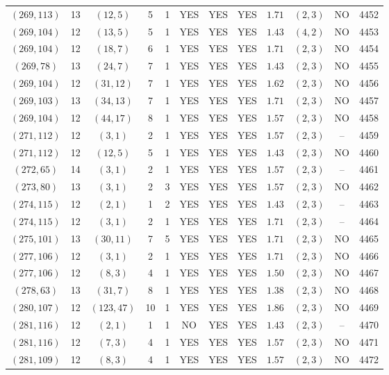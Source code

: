 \begin{longtable}{|c|c|c|c|c|c|c|c|c|c|c|c|}
$(269,113)$ & 13 & $(12,5)$ & 5 & 1 & YES & YES & YES & $1.71$ & $(2,3)$ & NO & 4452\\
$(269,104)$ & 12 & $(13,5)$ & 5 & 1 & YES & YES & YES & $1.43$ & $(4,2)$ & NO & 4453\\
$(269,104)$ & 12 & $(18,7)$ & 6 & 1 & YES & YES & YES & $1.71$ & $(2,3)$ & NO & 4454\\
$(269,78)$ & 13 & $(24,7)$ & 7 & 1 & YES & YES & YES & $1.43$ & $(2,3)$ & NO & 4455\\
$(269,104)$ & 12 & $(31,12)$ & 7 & 1 & YES & YES & YES & $1.62$ & $(2,3)$ & NO & 4456\\
$(269,103)$ & 13 & $(34,13)$ & 7 & 1 & YES & YES & YES & $1.71$ & $(2,3)$ & NO & 4457\\
$(269,104)$ & 12 & $(44,17)$ & 8 & 1 & YES & YES & YES & $1.57$ & $(2,3)$ & NO & 4458\\
$(271,112)$ & 12 & $(3,1)$ & 2 & 1 & YES & YES & YES & $1.57$ & $(2,3)$ & -- & 4459\\
$(271,112)$ & 12 & $(12,5)$ & 5 & 1 & YES & YES & YES & $1.43$ & $(2,3)$ & NO & 4460\\
$(272,65)$ & 14 & $(3,1)$ & 2 & 1 & YES & YES & YES & $1.57$ & $(2,3)$ & -- & 4461\\
$(273,80)$ & 13 & $(3,1)$ & 2 & 3 & YES & YES & YES & $1.57$ & $(2,3)$ & NO & 4462\\
$(274,115)$ & 12 & $(2,1)$ & 1 & 2 & YES & YES & YES & $1.43$ & $(2,3)$ & -- & 4463\\
$(274,115)$ & 12 & $(3,1)$ & 2 & 1 & YES & YES & YES & $1.71$ & $(2,3)$ & -- & 4464\\
$(275,101)$ & 13 & $(30,11)$ & 7 & 5 & YES & YES & YES & $1.71$ & $(2,3)$ & NO & 4465\\
$(277,106)$ & 12 & $(3,1)$ & 2 & 1 & YES & YES & YES & $1.71$ & $(2,3)$ & NO & 4466\\
$(277,106)$ & 12 & $(8,3)$ & 4 & 1 & YES & YES & YES & $1.50$ & $(2,3)$ & NO & 4467\\
$(278,63)$ & 13 & $(31,7)$ & 8 & 1 & YES & YES & YES & $1.38$ & $(2,3)$ & NO & 4468\\
$(280,107)$ & 12 & $(123,47)$ & 10 & 1 & YES & YES & YES & $1.86$ & $(2,3)$ & NO & 4469\\
$(281,116)$ & 12 & $(2,1)$ & 1 & 1 & NO & YES & YES & $1.43$ & $(2,3)$ & -- & 4470\\
$(281,116)$ & 12 & $(7,3)$ & 4 & 1 & YES & YES & YES & $1.57$ & $(2,3)$ & NO & 4471\\
$(281,109)$ & 12 & $(8,3)$ & 4 & 1 & YES & YES & YES & $1.57$ & $(2,3)$ & NO & 4472\\

\end{longtable}

